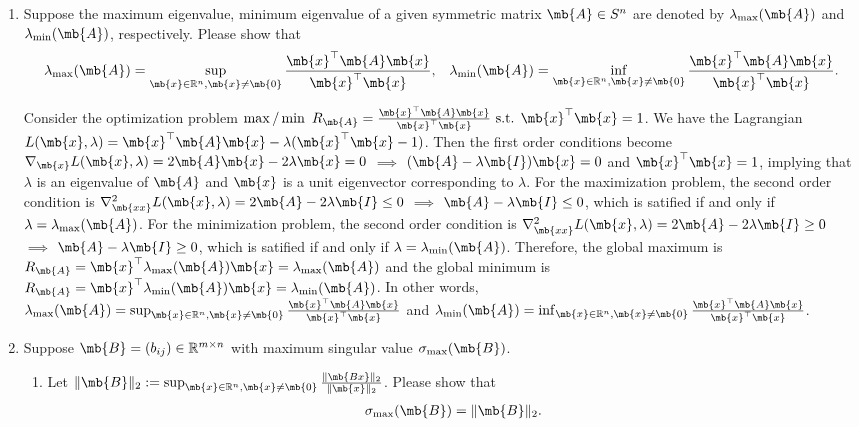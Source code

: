 \newpage
\begin{exercise}
	\begin{enumerate}
		\item Suppose the maximum eigenvalue, minimum eigenvalue of a given symmetric matrix $\mb{A}\in S^n$ are denoted by $\lambda_{\max}(\mb{A})$ and $ \lambda_{\min}(\mb{A})$, respectively. Please show that
			\begin{align*}
				\lambda_{\max}(\mb{A})=\sup_{\mb{x}\in\mathbb{R}^n, \mb{x}\not=\mb{0}} \frac{\mb{x}^\top\mb{A}\mb{x}}{\mb{x}^\top\mb{x}},\,\,\,\,\,
				\lambda_{\min}(\mb{A})=\inf_{\mb{x}\in\mathbb{R}^n, \mb{x}\not=\mb{0}} \frac{\mb{x}^\top\mb{A}\mb{x}}{\mb{x}^\top\mb{x}}.
			\end{align*}

			\begin{solution}
				Consider the optimization problem $\max / \min \ R_\mb{A} = \frac{\mb{x}^\top\mb{A}\mb{x}}{\mb{x}^\top\mb{x}} \text{ s.t. } \mb{x}^\top\mb{x} = 1$.
				We have the Lagrangian $L(\mb{x},\lambda)=\mb{x}^\top\mb{A}\mb{x}-\lambda(\mb{x}^\top\mb{x}-1)$.
				Then the first order conditions become $\nabla_\mb{x} L(\mb{x},\lambda) = 2\mb{A}\mb{x}-2\lambda\mb{x}=0$ $\implies$ $(\mb{A}-\lambda\mb{I})\mb{x}=0$ and $\mb{x}^\top\mb{x}=1$, implying that $\lambda$ is an eigenvalue of $\mb{A}$ and $\mb{x}$ is a unit eigenvector corresponding to $\lambda$.
				For the maximization problem, the second order condition is $\nabla^2_\mb{xx} L(\mb{x},\lambda) = 2\mb{A}-2\lambda\mb{I} \leq 0$ $\implies$ $\mb{A}-\lambda\mb{I} \leq 0$, which is satified if and only if $\lambda = \lambda_{\max}(\mb{A})$.
				For the minimization problem, the second order condition is $\nabla^2_\mb{xx} L(\mb{x},\lambda) = 2\mb{A}-2\lambda\mb{I} \geq 0$ $\implies$ $\mb{A}-\lambda\mb{I} \geq 0$, which is satified if and only if $\lambda = \lambda_{\min}(\mb{A})$.
				Therefore, the global maximum is $R_\mb{A} = \mb{x}^\top\lambda_{\max}(\mb{A})\mb{x} = \lambda_{\max}(\mb{A})$ and the global minimum is $R_\mb{A} = \mb{x}^\top\lambda_{\min}(\mb{A})\mb{x} = \lambda_{\min}(\mb{A})$. In other words, $\lambda_{\max}(\mb{A})=\sup_{\mb{x}\in\mathbb{R}^n, \mb{x}\not=\mb{0}} \frac{\mb{x}^\top\mb{A}\mb{x}}{\mb{x}^\top\mb{x}}$ and $
					\lambda_{\min}(\mb{A})=\inf_{\mb{x}\in\mathbb{R}^n, \mb{x}\not=\mb{0}} \frac{\mb{x}^\top\mb{A}\mb{x}}{\mb{x}^\top\mb{x}}$.
				\qedhere
			\end{solution}

		\item Suppose $\mb{B}=(b_{ij})\in \mathbb{R}^{m\times n}$ with maximum singular value $\sigma_{\max}(\mb{B})$.
			\begin{enumerate}
				\item Let $\|\mb{B}\|_2:=\sup_{\mb{x}\in\mathbb{R}^n, \mb{x}\not=\mb{0}}\frac{\|\mb{Bx}\|_2}{\|\mb{x}\|_2}$. Please show that
					\begin{align*}
						\sigma_{\max}(\mb{B})=\|\mb{B}\|_2.
					\end{align*}


\end{enumerate}
\end{enumerate}
\end{exercise}

